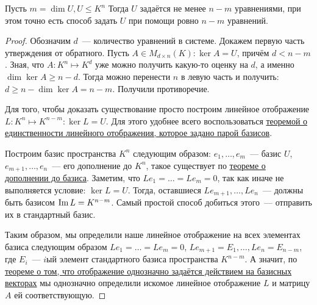 \begin{statement}
    Пусть $m = \dim U, U\leq K^n$ Тогда $U$ задаётся не менее $n - m$ уравнениями, при этом
    точно есть способ задать $U$ при помощи ровно $n - m$ уравнений.
\end{statement}
\begin{proof}
    Обозначим $d$~--- количество уравнений в системе. Докажем первую часть утверждения от обратного. 
    Пусть $A\in M_{d\times n}(K)\colon \ker A = U$, причём $d < n - m$.
    Зная, что $A\colon K^n\mapsto K^d$ уже можно получить какую-то оценку на $d$, 
    а именно $\dim \ker A \geq n - d$. Тогда можно перенести $n$ в левую часть и получить:
    $d \geq n - \dim \ker A =  n - m$. Получили противоречие.

    Для того, чтобы доказать существование просто построим линейное отображение $L: K^n\mapsto K^{n-m}\colon
    \ker L = U$. Для этого удобнее всего воспользоваться 
    \hyperref[thm:Линейное отображение определяется действием на базисных векторах]{теоремой о единственности линейного
    отображения, которое задано парой базисов}.

    Построим базис пространства $K^n$ следующим образом:  $e_1,\dots,e_m$~--- базис $U$,
    $e_{m + 1},\dots, e_n$~--- его дополнение до $K^n$, такое существует по 
    \hyperref[thm:О дополнении до базиса]{теореме о дополнении до базиса}.
    Заметим, что $Le_1 = \dots = Le_m = 0$, так как иначе не выполняется условие: $\ker L = U$. 
    Тогда, оставшиеся $Le_{m + 1},\dots, Le_n$~--- должны быть базисом $\operatorname{Im} L = K^{n - m}$.
    Самый простой способ добиться этого~--- отправить их в стандартный базис.
    
    Таким образом, мы определили наше линейное отображение на всех элементах базиса
    следующим образом $Le_1 = \dots = Le_m = 0$, $Le_{m + 1} = E_1, \dots, Le_n = E_{n - m}$,
    где $E_i$~--- $i$ый элемент стандартного базиса пространства $K^{n-m}$. А значит, по 
    \hyperref[thm:Линейное отображение определяется действием на базисных векторах]
    {теореме о том, что отображение однозначно задаётся действием на базисных векторах}
    мы однозначно определили искомое линейное отображение $L$ и матрицу $A$ ей соответствующую.
\end{proof}
